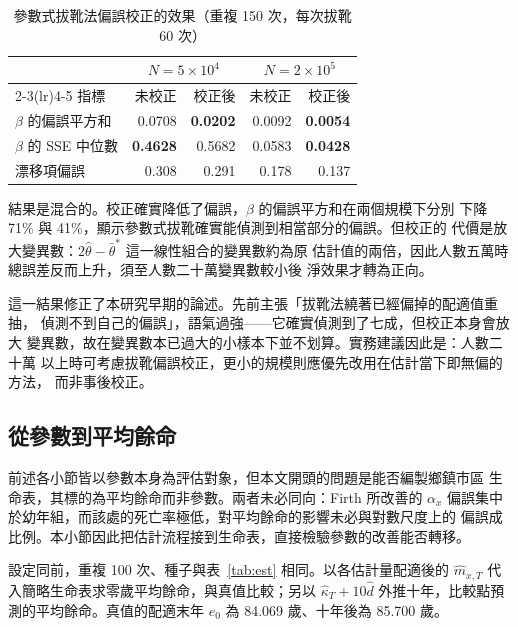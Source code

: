 \documentclass[UTF8, fontset=macnew, a4paper, 12pt]{ctexart}
\begin{document}
\begin{table}[H]
\centering
\caption{參數式拔靴法偏誤校正的效果（重複 150 次，每次拔靴 60 次）}
\small
\begin{tabular}{lrrrr}
\toprule
 & \multicolumn{2}{c}{$N=5\times10^4$} & \multicolumn{2}{c}{$N=2\times10^5$}\\
\cmidrule(lr){2-3}\cmidrule(lr){4-5}
指標 & 未校正 & 校正後 & 未校正 & 校正後\\
\midrule
$\beta$ 的偏誤平方和 & 0.0708 & \textbf{0.0202} & 0.0092 & \textbf{0.0054}\\
$\beta$ 的 SSE 中位數 & \textbf{0.4628} & 0.5682 & 0.0583 & \textbf{0.0428}\\
漂移項偏誤 & 0.308 & 0.291 & 0.178 & 0.137\\
\bottomrule
\end{tabular}
\label{tab:postcorr}
\end{table}

結果是混合的。校正確實降低了偏誤，$\beta$ 的偏誤平方和在兩個規模下分別
下降 71\% 與 41\%，顯示參數式拔靴確實能偵測到相當部分的偏誤。但校正的
代價是放大變異數：$2\hat\theta-\bar\theta^*$ 這一線性組合的變異數約為原
估計值的兩倍，因此人數五萬時總誤差反而上升，須至人數二十萬變異數較小後
淨效果才轉為正向。

這一結果修正了本研究早期的論述。先前主張「拔靴法繞著已經偏掉的配適值重抽，
偵測不到自己的偏誤」，語氣過強——它確實偵測到了七成，但校正本身會放大
變異數，故在變異數本已過大的小樣本下並不划算。實務建議因此是：人數二十萬
以上時可考慮拔靴偏誤校正，更小的規模則應優先改用在估計當下即無偏的方法，
而非事後校正。

\subsection{從參數到平均餘命}\label{sec:e0}

前述各小節皆以參數本身為評估對象，但本文開頭的問題是能否編製鄉鎮市區
生命表，其標的為平均餘命而非參數。兩者未必同向：Firth 所改善的 $\alpha_x$
偏誤集中於幼年組，而該處的死亡率極低，對平均餘命的影響未必與對數尺度上的
偏誤成比例。本小節因此把估計流程接到生命表，直接檢驗參數的改善能否轉移。

設定同前，重複 100 次、種子與表~\ref{tab:est} 相同。以各估計量配適後的
$\hat m_{x,T}$ 代入簡略生命表求零歲平均餘命，與真值比較；另以
$\hat\kappa_T+10\hat d$ 外推十年，比較點預測的平均餘命。真值的配適末年
$e_0$ 為 84.069 歲、十年後為 85.700 歲。
\end{document}
